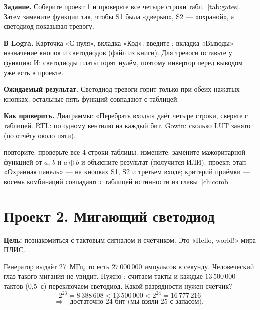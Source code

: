 \begin{diybox}
\textbf{Задание.} Соберите проект 1 и проверьте все четыре строки табл.~\ref{tab:gates}. Затем замените функции так, чтобы S1 была «дверью», S2 --- «охраной», а светодиод показывал тревогу.

\textbf{В Logra.} Карточка «С нуля», вкладка «Код»: введите ; вкладка «Выводы» --- назначение кнопок и светодиодов (файл  из книги). Для тревоги оставьте у  функцию И: светодиоды платы горят нулём, поэтому инвертор перед выводом уже есть в проекте.

\textbf{Ожидаемый результат.} Светодиод тревоги горит только при обеих нажатых кнопках; остальные пять функций совпадают с таблицей.

\textbf{Как проверить.} Диаграммы: «Перебрать входы» даёт четыре строки, сверьте с таблицей. RTL: по одному вентилю на каждый бит. Gowin: сколько LUT занято (по отчёту около пяти).

 повторите: проверьте все 4 строки таблицы.  измените: замените  мажоритарной функцией от $a$, $b$ и $a\oplus b$ и объясните результат (получится ИЛИ).  проект: этап «Охранная панель» ---  на кнопках S1, S2 и третьем входе; критерий приёмки --- восемь комбинаций совпадают с таблицей истинности из главы~\ref{ch:comb}.
\end{diybox}

\section{Проект 2. Мигающий светодиод}

\textbf{Цель:} познакомиться с тактовым сигналом и счётчиком. Это
«Hello, world!» мира ПЛИС.

Генератор выдаёт \SI{27}{МГц}, то есть $27\,000\,000$ импульсов в секунду.
Человеческий глаз такого мигания не увидит. Нужно :
считаем такты и каждые $13\,500\,000$ тактов (0,5~с) переключаем
светодиод. Какой разрядности нужен счётчик?
\[
  2^{23} = 8\,388\,608 < 13\,500\,000 < 2^{24} = 16\,777\,216
\]
\[
  \Rightarrow\quad \text{достаточно 24 бит (мы взяли 25 с запасом).}
\]

